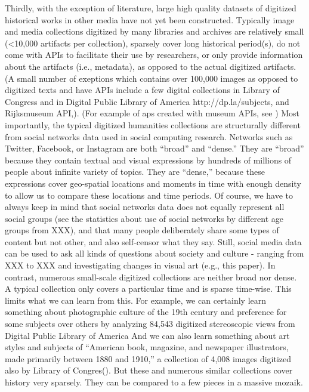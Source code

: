 \documentclass[letterpaper]{article}
\begin{document}
Thirdly, with the exception of literature, large high quality datasets of digitized historical works in other media have not yet been constructed. Typically image and media collections digitized by many libraries and archives are relatively small (<10,000 artifacts per collection), sparsely cover long historical period(s), do not come with APIs to facilitate their use by researchers, or only provide information about the artifacts (i.e., metadata), as opposed to the actual digitized artifacts. (A small number of exeptions which contains over 100,000 images as opposed to digitized texts and have APIs include a few digital collections in Library of Congress and in Digital Public Library of America http://dp.la/subjects, and Rijksmuseum API,). 
(For example of aps created with museum APIs, see )
	Most importantly, the typical digitized humanities collections are structurally different from social networks data used in social computing research. Networks such as Twitter, Facebook, or Instagram are both “broad” and “dense.” They are “broad” because they contain textual and visual expressions by hundreds of millions of people about infinite variety of topics. They are “dense,” because these expressions cover geo-spatial locations and moments in time with enough density to allow us to compare these locations and time periods. Of course, we have to always keep in mind that social networks data does not equally represent all social groups (see the statistics about use of social networks by different age groups from  XXX), and that many people deliberately share some types of content but not other, and also self-censor what they say. Still, social media data can be used to ask all kinds of questions about society and culture - ranging from XXX  to XXX and investigating changes in visual art (e.g., this paper). 
In contrast, numerous small-scale digitized collections are neither broad nor dense. A typical collection only covers a particular time and is sparse time-wise. This limits what we can learn from this. For example, we can certainly learn something about photographic culture of the 19th century and preference for some subjects over others by analyzing 84,543 digitized stereoscopic views from Digital Public Library of America  And we can also learn something about art styles and subjects of “American book, magazine, and newspaper illustrators, made primarily between 1880 and 1910,” a collection of 4,008 images digitized also by Library of Congres(). But these and numerous similar collections cover history very sparsely. They can be compared to a few pieces in a massive mozaik. 
\end{document}
